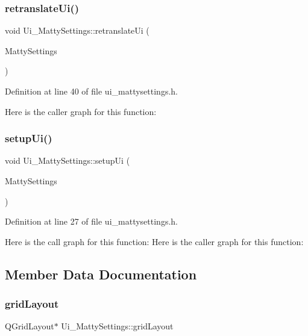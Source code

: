 \subsubsection{\texorpdfstring{retranslate\+Ui()}{retranslateUi()}}
{\footnotesize\ttfamily void Ui\+\_\+\+Matty\+Settings\+::retranslate\+Ui (\begin{DoxyParamCaption}\item[{Q\+Widget $\ast$}]{Matty\+Settings }\end{DoxyParamCaption})\hspace{0.3cm}{\ttfamily [inline]}}



Definition at line 40 of file ui\+\_\+mattysettings.\+h.

Here is the caller graph for this function\+:
\hypertarget{classUi__MattySettings_aa5a49194b05cc0f4d7f06d99f18e253e}{}\label{classUi__MattySettings_aa5a49194b05cc0f4d7f06d99f18e253e} 
\subsubsection{\texorpdfstring{setup\+Ui()}{setupUi()}}
{\footnotesize\ttfamily void Ui\+\_\+\+Matty\+Settings\+::setup\+Ui (\begin{DoxyParamCaption}\item[{Q\+Widget $\ast$}]{Matty\+Settings }\end{DoxyParamCaption})\hspace{0.3cm}{\ttfamily [inline]}}



Definition at line 27 of file ui\+\_\+mattysettings.\+h.

Here is the call graph for this function\+:
Here is the caller graph for this function\+:


\subsection{Member Data Documentation}
\hypertarget{classUi__MattySettings_a289ca61cb5fd260abf4fbe3d872f6676}{}\label{classUi__MattySettings_a289ca61cb5fd260abf4fbe3d872f6676} 
\subsubsection{\texorpdfstring{grid\+Layout}{gridLayout}}
{\footnotesize\ttfamily Q\+Grid\+Layout$\ast$ Ui\+\_\+\+Matty\+Settings\+::grid\+Layout}



